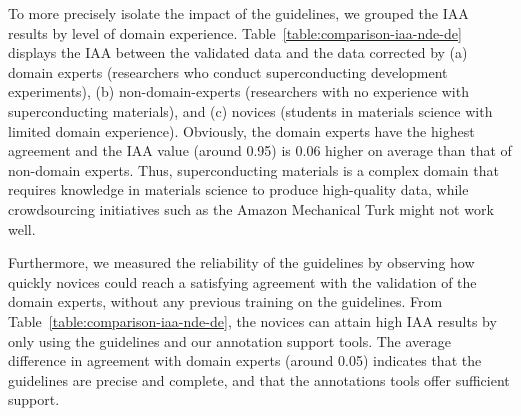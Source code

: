 \documentclass[]{interact}
\theoremstyle{plain}%
\theoremstyle{definition}
\theoremstyle{remark}
\begin{document}
To more precisely isolate the impact of the guidelines, we grouped the IAA results by level of domain experience. 
Table~\ref{table:comparison-iaa-nde-de} displays the IAA between the validated data and the data corrected by (a) domain experts (researchers who conduct superconducting development experiments), (b) non-domain-experts (researchers with no experience with superconducting materials), and (c) novices (students in materials science with limited domain experience). 
Obviously, the domain experts have the highest agreement and the IAA value (around 0.95) is 0.06 higher on average than that of non-domain experts. 
Thus, superconducting materials is a complex domain that requires knowledge in materials science to produce high-quality data, while crowdsourcing initiatives such as the Amazon Mechanical Turk might not work well. 

Furthermore, we measured the reliability of the guidelines by observing how quickly novices could reach a satisfying agreement with the validation of the domain experts, without any previous training on the guidelines.
From Table~\ref{table:comparison-iaa-nde-de}, the  novices can attain high IAA results by only using the guidelines and our annotation support tools. 
The average difference in agreement with domain experts (around 0.05) indicates that the guidelines are precise and complete, and that the annotations tools offer sufficient support. 

\end{document}
